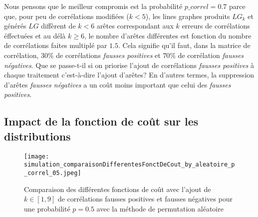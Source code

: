 \documentclass[onecolumn, 12pt]{book}
\begin{document}
Nous pensons que le meilleur compromis est la probabilit\'e $p\_correl = 0.7$ parce que, pour peu de corr\'elations modifi\'ees ($k<5$), les lines graphes produits $LG_k$ et g\'en\'er\'es $LG$ diff\`erent de $k<6$ ar\^etes correspondant aux $k$ erreurs de  corr\'elations \'effectu\'ees  et au d\'el\`a $k \geq 6$, le nombre d'ar\^etes diff\'erentes est fonction du nombre de corr\'elations faites multipl\'e par $1.5$.
Cela signifie qu'il faut, dans la matrice de corr\'elation, $30\%$ de corr\'elations {\em fausses positives} et $70\%$ de corr\'elation {\em fausses n\'egatives}. 
\newline
Que se passe-t-il si on priorise l'ajout de corr\'elations {\em fausses positives} \`a chaque traitement c'est-\`a-dire l'ajout d'ar\^etes?  
En d'autres termes, la suppression d'ar\^etes {\em fausses n\'egatives} a un co\^ut moins important que celui des {\em fausses positives}. 

\subsection{Impact de la fonction de co\^ut sur les distributions}
\label{fonctionDeCout}

\begin{figure}[htb!] 
\centering
\texttt{[image: simulation\_comparaisonDifferentesFonctDeCout\_by\_aleatoire\_p\_correl\_05.jpeg]}
\caption{ Comparaison des diff\'erentes fonctions de co\^ut avec l'ajout de $k \in [1,9]$ de corr\'elations fausses positives et fausses n\'egatives pour une probabilit\'e $p = 0.5$ avec la m\'ethode de permutation al\'eatoire }
\label{compareDifferentesFonctionDeCout_p05} 
\end{figure}
\end{document}
